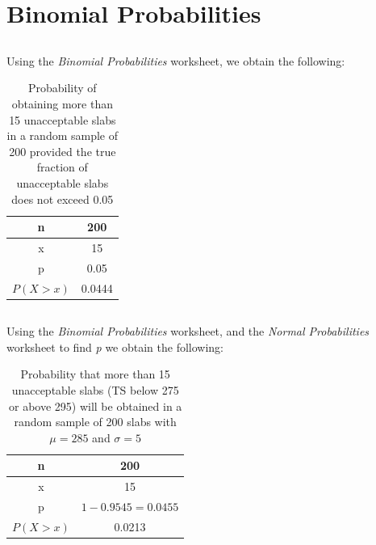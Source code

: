 \documentclass[letterpaper]{article}
\begin{document}
\section{Binomial Probabilities}

\subsection{} %

Using the \textit{Binomial Probabilities} worksheet, we obtain the following:
\begin{table}[H]
 \centering
 \begin{tabular}{|c|c|}
  \hline
  n        & 200    \\ \hline
  x        & 15     \\ \hline
  p        & 0.05   \\ \hline
  $P(X>x)$ & 0.0444 \\ \hline
 \end{tabular}
 \caption{Probability of obtaining more than 15 unacceptable slabs
  in a random sample of 200 provided the true fraction of unacceptable slabs does not
  exceed 0.05}
\end{table}

\subsection{} %
Using the \textit{Binomial Probabilities} worksheet, and the \textit{Normal
 Probabilities} worksheet to find \textit{p} we obtain the following:

\begin{table}[H]
 \centering
 \begin{tabular}{|c|c|}
  \hline
  n        & 200               \\ \hline
  x        & 15                \\ \hline
  p        & $1-0.9545=0.0455$ \\ \hline
  $P(X>x)$ & 0.0213            \\ \hline
 \end{tabular}
 \caption{Probability that more than 15 unacceptable slabs
  (TS below 275 or above 295) will be obtained in a random sample of 200 slabs with $\mu=285$ and $\sigma=5$}
\end{table}
\end{document}
